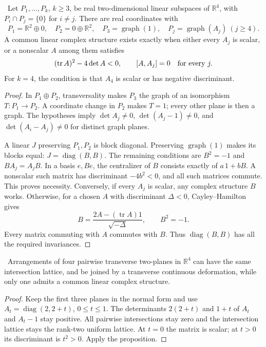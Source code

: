 \begin{proposition}\ours\ 
Let \(P_1,\ldots,P_k\), \(k\geq3\), be real two-dimensional linear
subspaces of \(\mathbb R^4\), with \(P_i\cap P_j=\{0\}\) for
\(i\ne j\). There are real coordinates with
\[
 P_1=\mathbb R^2\oplus0,\quad P_2=0\oplus\mathbb R^2,\quad
 P_3=\operatorname{graph}(1),\quad
 P_j=\operatorname{graph}(A_j)\ (j\geq4).
\]
A common linear complex structure exists exactly when either every
\(A_j\) is scalar, or a nonscalar \(A\) among them satisfies
\[
 (\operatorname{tr}A)^2-4\det A<0,\qquad
 [A,A_j]=0\quad\hbox{for every }j.
\]
For \(k=4\), the condition is that \(A_4\) is scalar or has negative
discriminant.
\end{proposition}
\begin{proof}
In \(P_1\oplus P_2\), transversality makes \(P_3\) the graph of an
isomorphism \(T:P_1\to P_2\). A coordinate change in \(P_2\)
makes \(T=1\); every other plane is then a graph.
The hypotheses imply
\(\det A_j\ne0\), \(\det(A_j-1)\ne0\), and
\(\det(A_i-A_j)\ne0\) for distinct graph planes.

A linear \(J\) preserving \(P_1,P_2\) is block diagonal.
Preserving \(\operatorname{graph}(1)\) makes its blocks equal:
\(J=\operatorname{diag}(B,B)\). The remaining conditions are
\(B^2=-1\) and \(BA_j=A_jB\).
In a basis \(e,Be\), the centralizer of \(B\) consists exactly of
\(a\,1+bB\). A nonscalar such matrix has discriminant \(-4b^2<0\),
and all such matrices commute. This proves necessity.
Conversely, if every \(A_j\) is scalar, any complex structure \(B\)
works. Otherwise, for a chosen \(A\) with discriminant \(\Delta<0\),
Cayley--Hamilton gives
\[
 B=\frac{2A-(\operatorname{tr}A)1}{\sqrt{-\Delta}},
 \qquad B^2=-1.
\]
Every matrix commuting with \(A\) commutes with \(B\).
Thus \(\operatorname{diag}(B,B)\) has all the required invariances.
\end{proof}

\begin{corollary}[The intersection lattice is insufficient]\ours\ 
Arrangements of four pairwise transverse two-planes in \(\mathbb R^4\)
can have the same intersection lattice, and be joined by a transverse
continuous deformation, while only one admits a common linear
complex structure.
\end{corollary}
\begin{proof}
Keep the first three planes in the normal form and use
\(A_t=\operatorname{diag}(2,2+t)\), \(0\leq t\leq1\).
The determinants \(2(2+t)\) and \(1+t\) of \(A_t\) and \(A_t-1\)
stay positive. All pairwise intersections stay zero and the
intersection lattice stays the rank-two uniform lattice.
At \(t=0\) the matrix is scalar; at \(t>0\) its discriminant is
\(t^2>0\). Apply the proposition.
\end{proof}

